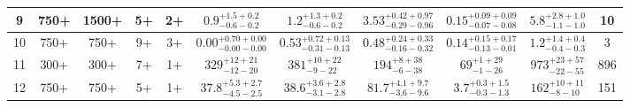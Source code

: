 \begin{table*}[hp]
{\begin{tabular}{|c|cccc|cccc||c|c|}
9 & 750+ & 1500+ & 5+ & 2+ & $0.9^{+1.5+0.2}_{-0.6-0.2}$ & $1.2^{+1.3+0.2}_{-0.6-0.2}$ & $3.53^{+0.42+0.97}_{-0.29-0.96}$ & $0.15^{+0.09+0.09}_{-0.07-0.08}$ & $5.8^{+2.8+1.0}_{-1.1-1.0}$ & 10 \\ \hline
10 & 750+ & 750+ & 9+ & 3+ & $0.00^{+0.70+0.00}_{-0.00-0.00}$ & $0.53^{+0.72+0.13}_{-0.31-0.13}$ & $0.48^{+0.24+0.33}_{-0.16-0.32}$ & $0.14^{+0.15+0.17}_{-0.13-0.01}$ & $1.2^{+1.4+0.4}_{-0.4-0.3}$ & 3 \\ \hline
11 & 300+ & 300+ & 7+ & 1+ & $329^{+12+21}_{-12-20}$ & $381^{+10+22}_{- 9-22}$ & $194^{+ 8+38}_{- 6-38}$ & $69^{+ 1+29}_{- 1-26}$ & $973^{+23+57}_{-22-55}$ & 896 \\ \hline
12 & 750+ & 750+ & 5+ & 1+ & $37.8^{+5.3+2.7}_{-4.5-2.5}$ & $38.6^{+3.6+2.8}_{-3.1-2.8}$ & $81.7^{+4.1+9.7}_{-3.6-9.6}$ & $3.7^{+0.3+1.5}_{-0.3-1.3}$ & $162^{+10+11}_{- 8-10}$ & 151 \\ \hline
\hline
  \end{tabular}}
\end{table*}


